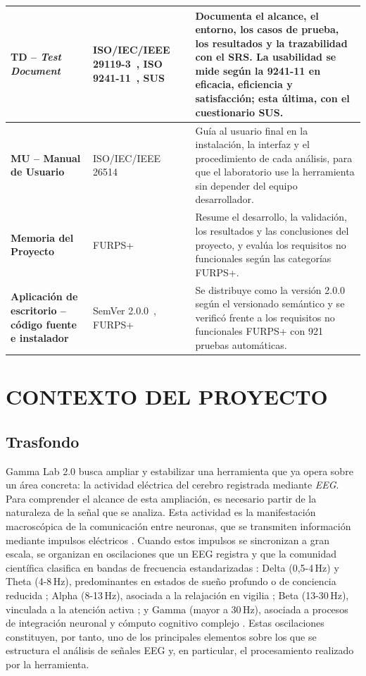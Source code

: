 \documentclass[12pt,letterpaper,oneside]{article}
\newcommand{\capitulo}[1]{\clearpage\section{#1}}
\begin{document}
\begin{longtable}{|>{\raggedright\arraybackslash}p{}|>{\raggedright\arraybackslash}p{}|>{\raggedright\arraybackslash}p{}|}
\hline
\textbf{TD -- \textit{Test Document}} & ISO/IEC/IEEE 29119-3~\cite{iso29119-3}, ISO 9241-11~\cite{iso9241-11}, SUS~\cite{brooke1996} & Documenta el alcance, el entorno, los casos de prueba, los resultados y la trazabilidad con el SRS. La usabilidad se mide según la 9241-11 en eficacia, eficiencia y satisfacción; esta última, con el cuestionario SUS. \\
\hline
\textbf{MU -- Manual de Usuario} & ISO/IEC/IEEE 26514~\cite{iso26514} & Guía al usuario final en la instalación, la interfaz y el procedimiento de cada análisis, para que el laboratorio use la herramienta sin depender del equipo desarrollador. \\
\hline
\textbf{Memoria del Proyecto} & FURPS+~\cite{eeles2001} & Resume el desarrollo, la validación, los resultados y las conclusiones del proyecto, y evalúa los requisitos no funcionales según las categorías FURPS+. \\
\hline
\textbf{Aplicación de escritorio -- código fuente e instalador} & SemVer 2.0.0~\cite{semver}, FURPS+~\cite{eeles2001} & Se distribuye como la versión 2.0.0 según el versionado semántico y se verificó frente a los requisitos no funcionales FURPS+ con 921 pruebas automáticas. \\
\hline
\end{longtable}
\endgroup

\capitulo{CONTEXTO DEL PROYECTO}

\subsection{Trasfondo}

Gamma Lab 2.0 busca ampliar y estabilizar una herramienta que ya opera sobre un área concreta: la actividad eléctrica del cerebro registrada mediante \textit{EEG}. Para comprender el alcance de esta ampliación, es necesario partir de la naturaleza de la señal que se analiza. Esta actividad es la manifestación macroscópica de la comunicación entre neuronas, que se transmiten información mediante impulsos eléctricos \cite{morris2025}. Cuando estos impulsos se sincronizan a gran escala, se organizan en oscilaciones que un EEG registra y que la comunidad científica clasifica en bandas de frecuencia estandarizadas \cite{nunez2017}: Delta (0,5-4\,Hz) y Theta (4-8\,Hz), predominantes en estados de sueño profundo o de conciencia reducida \cite{kropotov2009}; Alpha (8-13\,Hz), asociada a la relajación en vigilia \cite{nunez2017}; Beta (13-30\,Hz), vinculada a la atención activa \cite{nunez2017}; y Gamma (mayor a 30\,Hz), asociada a procesos de integración neuronal y cómputo cognitivo complejo \cite{normaleeg2019}. Estas oscilaciones constituyen, por tanto, uno de los principales elementos sobre los que se estructura el análisis de señales EEG y, en particular, el procesamiento realizado por la herramienta.
\end{document}

